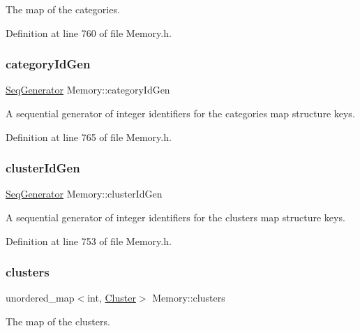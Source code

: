 The map of the categories. 

Definition at line 760 of file Memory.\+h.

\mbox{\label{class_memory_a9e1a47adebdbbbade810a92215903ce1}} 
\subsubsection{\texorpdfstring{category\+Id\+Gen}{categoryIdGen}}
{\footnotesize\ttfamily \hyperlink{class_seq_generator}{Seq\+Generator} Memory\+::category\+Id\+Gen\hspace{0.3cm}{\ttfamily [protected]}}

A sequential generator of integer identifiers for the categories map structure keys. 

Definition at line 765 of file Memory.\+h.

\mbox{\label{class_memory_aedc30fc567e03bfa3fa43fb47ba506f8}} 
\subsubsection{\texorpdfstring{cluster\+Id\+Gen}{clusterIdGen}}
{\footnotesize\ttfamily \hyperlink{class_seq_generator}{Seq\+Generator} Memory\+::cluster\+Id\+Gen\hspace{0.3cm}{\ttfamily [protected]}}

A sequential generator of integer identifiers for the clusters map structure keys. 

Definition at line 753 of file Memory.\+h.

\mbox{\label{class_memory_a9836b99d2ec4b06e98a90aa31d16439a}} 
\subsubsection{\texorpdfstring{clusters}{clusters}}
{\footnotesize\ttfamily unordered\+\_\+map$<$int, \hyperlink{class_cluster}{Cluster}$>$ Memory\+::clusters\hspace{0.3cm}{\ttfamily [protected]}}

The map of the clusters. 

